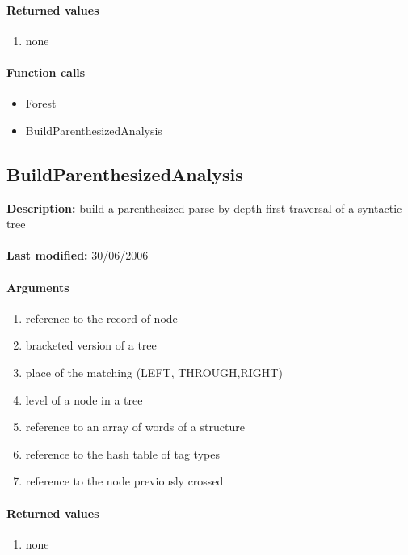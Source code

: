 \paragraph{Returned values}
\begin{enumerate}
\item none
\end{enumerate}

\paragraph{Function calls}
\begin{itemize}
\item Forest
\item BuildParenthesizedAnalysis
\end{itemize}

\subsection{BuildParenthesizedAnalysis}
\textbf{Description:} build a parenthesized parse by depth first traversal of a syntactic tree\\
\\\textbf{Last modified:} 30/06/2006

\paragraph{Arguments}
\begin{enumerate}
\item reference to the record of node
\item bracketed version of a tree
\item place of the matching (LEFT, THROUGH,RIGHT)
\item level of a node in a tree
\item reference to an array of words of a structure
\item reference to the hash table of tag types
\item reference to the node previously crossed
\end{enumerate}

\paragraph{Returned values}
\begin{enumerate}
\item none
\end{enumerate}

